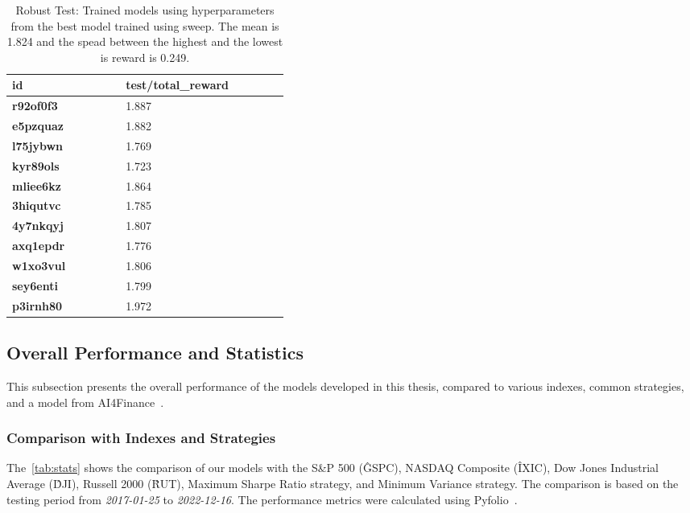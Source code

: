 \documentclass[../xlapes02]{subfiles}
\begin{document}
    \begin{table}[ht!]
        \centering
        \caption{Robust Test: Trained models using hyperparameters from the best model trained using sweep. The mean is 1.824 and the spead between the highest and the lowest is reward is 0.249.}
        \label{tab:robust}
        {\footnotesize\begin{tabular}{*{2}{|m{0.20\linewidth}|}}
                          \toprule
                          \bfseries id       & \bfseries test/total\_reward \\[0cm]
                          \midrule
                          \bfseries r92of0f3 & 1.887 \\[0cm]
                          \bfseries e5pzquaz & 1.882 \\[0cm]
                          \bfseries l75jybwn & 1.769 \\[0cm]
                          \bfseries kyr89ols & 1.723 \\[0cm]
                          \bfseries mliee6kz & 1.864 \\[0cm]
                          \bfseries 3hiqutvc & 1.785 \\[0cm]
                          \bfseries 4y7nkqyj & 1.807 \\[0cm]
                          \bfseries axq1epdr & 1.776 \\[0cm]
                          \bfseries w1xo3vul & 1.806 \\[0cm]
                          \bfseries sey6enti & 1.799 \\[0cm]
                          \bfseries p3irnh80 & 1.972 \\[0cm]
                          \bottomrule
        \end{tabular}}
    \end{table}

    \subsection{Overall Performance and Statistics}\label{subsec:overall-performance-and-statistics}
    This subsection presents the overall performance of the models developed in this thesis, compared to various indexes, common strategies, and a model from AI4Finance~\cite{finrl-portfolio-allocation-2020}.

    \subsubsection{Comparison with Indexes and Strategies}\label{subsubsec:indexes-and-strategies}
    The~\cref{tab:stats} shows the comparison of our models with the S\&P 500 (\^GSPC), NASDAQ Composite (\^IXIC), Dow Jones Industrial Average (\^DJI), Russell 2000 (\^RUT), Maximum Sharpe Ratio strategy, and Minimum Variance strategy. The comparison is based on the testing period from \emph{2017-01-25} to \emph{2022-12-16}. The performance metrics were calculated using Pyfolio~\cite{Pyfolio}.
\end{document}

